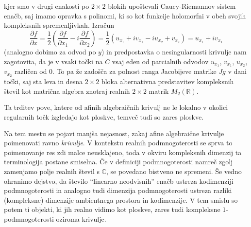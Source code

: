 \documentclass[mat1]{fmfdelo}
\numberwithin{equation}{section}
\newcommand{\R}{\mathbb R}
\newcommand{\C}{\mathbb C}
\newcommand{\pdv}[2][]{\frac{\partial#1}{\partial#2}}
\theoremstyle{definition}
\begin{document}
\begin{dokaz}
    \\  
    \\ 

    kjer smo v drugi enakosti po $2 \times 2$ blokih upoštevali Caucy-Riemannov sistem enačb, saj imamo opravka s polinomi, ki so kot funkcije holomorfni v obeh svojih kompleksnih spremenljivkah. Izračun
    \[
        \pdv[f]{x} = \frac{1}{2} \left( \pdv[f]{x_1} - i\pdv[f]{x_2}\right) = \frac{1}{2} \left( u_{x_1} + i v_{x_1} - i u_{x_2} + v_{x_2}\right) = u_{x_1} + iv_{x_1}
    \]
    (analogno dobimo za odvod po $y$) in predpostavka o nesingularnosti krivulje nam zagotovita, da je v vsaki točki na $C$ vsaj eden od parcialnih odvodov $u_{x_1}$, $v_{x_1}$, $u_{x_2}$, $v_{x_2}$ različen od $0$. To pa že zadošča za polnost ranga Jacobijeve matrike $Jg$ v dani točki, saj sta leva in desna $2 \times 2$ bloka alternativna predstavitev kompleksnih števil kot matrična algebra znotraj realnih $2 \times2$ matrik $M_2(\R)$.  
\end{dokaz}

Ta trditev pove, katere od afinih algebraičnih krivulj ne le lokalno v okolici regularnih točk izgledajo kot ploskve, temveč tudi so zares ploskve. 
\\
\par
Na tem mestu se pojavi manjša nejasnost, zakaj afine algebraične krivulje poimenovati ravno \emph{krivulje}. V kontekstu realnih podmnogoterosti se sprva to poimenovanje res zdi malce neusklajeno, toda v okviru kompleksnih dimenzij ta terminologija postane smiselna. Če v definiciji podmnogoterosti namreč zgolj zamenjamo polje realnih števil s $\C$, se povedano bistveno ne spremeni. Še vedno ohranimo dejstvo, da število ``linearno neodvisnih'' enačb ustreza kodimenziji podmnogoterosti in analogno tudi dimenzija podmnogoterosti ustreza razliki (kompleksne) dimenzije ambientnega prostora in kodimenzije. V tem smislu so potem ti objekti, ki jih realno vidimo kot ploskve, zares tudi kompleksne $1$-podmnogoterosti oziroma krivulje.
\end{document}
